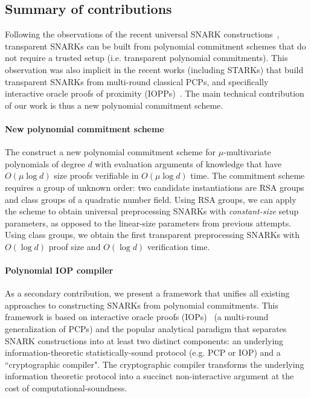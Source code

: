 \subsection{Summary of contributions} 
Following the observations of the recent universal SNARK constructions~\cite{PLONK, Sonic, Libra}, transparent SNARKs can be built from polynomial commitment schemes that do not require a trusted setup (i.e. transparent polynomial commitments). This observation was also implicit in the recent works (including STARKs) that build transparent SNARKs from multi-round classical PCPs, and specifically interactive oracle proofs of proximity (IOPPs)~\cite{ICALP:BBHR18}. The main technical contribution of our work is thus a new polynomial commitment scheme.

\paragraph{New polynomial commitment scheme} The construct a new polynomial commitment scheme for $\mu$-multivariate polynomials of degree $d$ with evaluation arguments of knowledge that have $O(\mu \log d)$ size proofs verifiable in $O(\mu \log d)$ time. The commitment scheme requires a group of unknown order: two candidate instantiations are RSA groups and class groups of a quadratic number field. Using RSA groups, we can apply the scheme to obtain universal preprocessing SNARKs with \emph{constant-size} setup parameters, as opposed to the linear-size parameters from previous attempts. Using class groups, we obtain the first transparent preprocessing SNARKs with $O(\log d)$ proof size and $O(\log d)$ verification time. %

\paragraph{Polynomial IOP compiler} As a secondary contribution, we present a framework that unifies all existing approaches to constructing SNARKs from polynomial commitments. This framework is based on interactive oracle proofs (IOPs)~\cite{STOC:ReiRotRot16, TCC:BenChiSpo16} (a multi-round generalization of PCPs) and the popular analytical paradigm that separates SNARK constructions into at least two distinct components: an underlying information-theoretic statistically-sound protocol (e.g. PCP or IOP) and a ``cryptographic compiler". The cryptographic compiler transforms the underlying information theoretic protocol into a succinct non-interactive argument at the cost of computational-soundness. 

